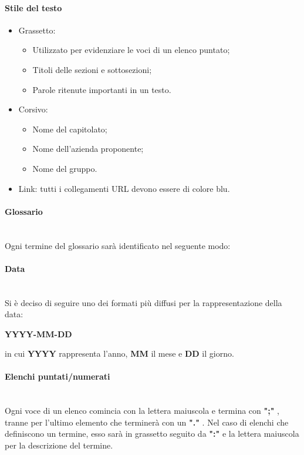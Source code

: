 \paragraph{Stile del testo}\mbox{}
\begin{itemize}
\item Grassetto:
\begin{itemize}
\item Utilizzato per evidenziare le voci di un elenco puntato;
\item Titoli delle sezioni e sottosezioni;
\item Parole ritenute importanti in un testo.
\end{itemize}
\item Corsivo:
\begin{itemize}
\item Nome del capitolato;
\item Nome dell'azienda proponente;
\item Nome del gruppo.
\end{itemize}
\item Link: tutti i collegamenti URL devono essere di colore blu.
\end{itemize}

\paragraph{Glossario}\mbox{} \\
Ogni termine del glossario sarà identificato nel seguente modo:
\begin{center}
\end{center}

\paragraph{Data}\mbox{} \\
Si è deciso di seguire uno dei formati più diffusi per la rappresentazione della data:
\begin{center}
\textbf{YYYY-MM-DD}
\end{center}
in cui \textbf{YYYY} rappresenta l'anno, \textbf{MM} il mese e \textbf{DD} il giorno.

\paragraph{Elenchi puntati/numerati}\mbox{} \\
Ogni voce di un elenco comincia con la lettera maiuscola e termina con \textbf{";"} , tranne per l'ultimo elemento che terminerà con un \textbf{"."} . 
Nel caso di elenchi che definiscono un termine, esso sarà in grassetto seguito da \textbf{":"} e la lettera maiuscola per la descrizione del termine.

